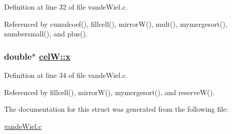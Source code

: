 Definition at line 32 of file vande\-Wiel.c.

Referenced by cumulcoef(), fillcell(), mirror\-W(), mult(), mymergesort(), numbersmall(), and plus().\hypertarget{structcelW_b443b2a7120f170c2c5e8012f4dd86d7}{
\subsubsection[x]{\setlength{\rightskip}{0pt plus 5cm}double$\ast$ \hyperlink{structcelW_b443b2a7120f170c2c5e8012f4dd86d7}{cel\-W::x}}}
\label{structcelW_b443b2a7120f170c2c5e8012f4dd86d7}




Definition at line 34 of file vande\-Wiel.c.

Referenced by fillcell(), mirror\-W(), mymergesort(), and reserve\-W().

The documentation for this struct was generated from the following file:\begin{CompactItemize}
\item 
\hyperlink{vandeWiel_8c}{vande\-Wiel.c}\end{CompactItemize}
